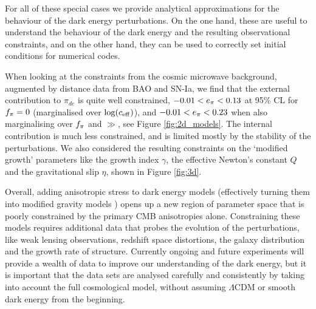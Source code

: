 For all of these special cases we provide analytical approximations for the behaviour of the dark energy perturbations.
On the one hand, these are useful to understand the behaviour of the dark energy and the resulting observational constraints, and on the other hand, they can be used to correctly set initial conditions for numerical codes. 

When looking at the constraints from the cosmic microwave background, augmented by distance data from BAO and SN-Ia,
we find that the external contribution to $\pi_{de}$ is quite well constrained, $-0.01 < \aa < 0.13$ at 95\% CL for $\ff=0$ (marginalised 
over $\log(\ceff)$), and $-0.01 < \aa < 0.23$ when also marginalising over $\ff$ and $\gg$,
see Figure \ref{fig:2d_models}. The internal contribution 
is much less constrained, and is limited mostly by the stability of the perturbations. We also considered the resulting
constraints on the `modified growth' parameters like the growth index $\gamma$, the effective Newton's constant $Q$
and the gravitational slip $\eta$, shown in Figure \ref{fig:3d}. 

Overall, adding anisotropic stress to dark energy models (effectively turning them into modified gravity models \cite{Saltas:2010tt})
opens up a new region of parameter space that is poorly constrained by the primary CMB anisotropies alone. Constraining these
models requires additional data that probes the evolution of the perturbations, like weak lensing observations, redshift space
distortions, the galaxy distribution and the growth rate of structure. Currently ongoing and future experiments will provide a wealth
of data to improve our understanding of the dark energy, but it is important that the data sets are analysed carefully and consistently
by taking into account the full cosmological model, without assuming $\Lambda$CDM or smooth dark energy from the beginning.
